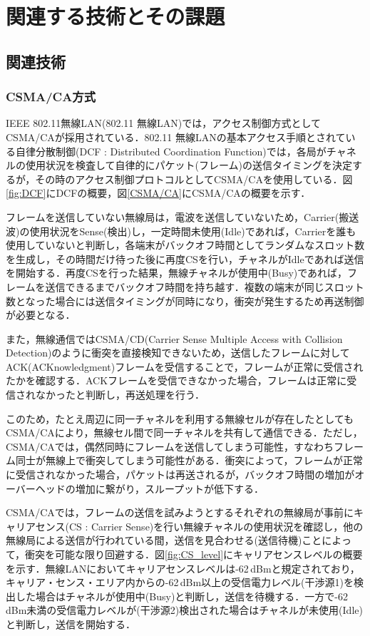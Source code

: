 \documentclass[a4paper,10pt]{ltjsarticle}
\begin{document}
\section{関連する技術とその課題}
\subsection{関連技術}
\subsubsection{CSMA/CA方式}


IEEE 802.11無線LAN(802.11 無線LAN)では，アクセス制御方式としてCSMA/CAが採用されている．802.11 無線LANの基本アクセス手順とされている自律分散制御(DCF : Distributed Coordination Function)では，各局がチャネルの使用状況を検査して自律的にパケット(フレーム)の送信タイミングを決定するが，その時のアクセス制御プロトコルとしてCSMA/CAを使用している．図\ref{fig:DCF}にDCFの概要，図\ref{CSMA/CA}にCSMA/CAの概要を示す．

フレームを送信していない無線局は，電波を送信していないため，Carrier(搬送波)の使用状況をSense(検出)し，一定時間未使用(Idle)であれば，Carrierを誰も使用していないと判断し，各端末がバックオフ時間としてランダムなスロット数を生成し，その時間だけ待った後に再度CSを行い，チャネルがIdleであれば送信を開始する．再度CSを行った結果，無線チャネルが使用中(Busy)であれば，フレームを送信できるまでバックオフ時間を持ち越す．複数の端末が同じスロット数となった場合には送信タイミングが同時になり，衝突が発生するため再送制御が必要となる．

また，無線通信ではCSMA/CD(Carrier Sense Multiple Access with Collision Detection)のように衝突を直接検知できないため，送信したフレームに対してACK(ACKnowledgment)フレームを受信することで，フレームが正常に受信されたかを確認する．ACKフレームを受信できなかった場合，フレームは正常に受信されなかったと判断し，再送処理を行う．

このため，たとえ周辺に同一チャネルを利用する無線セルが存在したとしてもCSMA/CAにより，無線セル間で同一チャネルを共有して通信できる．ただし，CSMA/CAでは，偶然同時にフレームを送信してしまう可能性，すなわちフレーム同士が無線上で衝突してしまう可能性がある．衝突によって，フレームが正常に受信されなかった場合，パケットは再送されるが，バックオフ時間の増加がオーバーヘッドの増加に繋がり，スループットが低下する．

CSMA/CAでは，フレームの送信を試みようとするそれぞれの無線局が事前にキャリアセンス(CS : Carrier Sense)を行い無線チャネルの使用状況を確認し，他の無線局による送信が行われている間，送信を見合わせる(送信待機)ことによって，衝突を可能な限り回避する．図\ref{fig:CS_level}にキャリアセンスレベルの概要を示す．無線LANにおいてキャリアセンスレベルは-62\,dBmと規定されており，キャリア・センス・エリア内からの-62\,dBm以上の受信電力レベル(干渉源1)を検出した場合はチャネルが使用中(Busy)と判断し，送信を待機する．一方で-62\,dBm未満の受信電力レベルが(干渉源2)検出された場合はチャネルが未使用(Idle)と判断し，送信を開始する．
\end{document}
